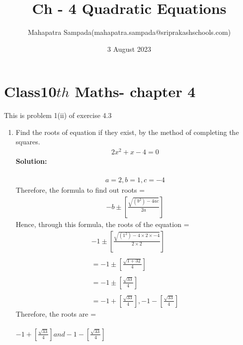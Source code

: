 \documentclass{article}
\title{Ch - 4 Quadratic Equations}
\author{Mahapatra Sampada(mahapatra.sampada@sriprakashschools.com)}
\date{3 August 2023}
\newcommand{\solution}{\noindent \textbf{Solution: }}
\begin{document}
\maketitle
\section*{Class10${th}$ Maths- chapter 4}
This is problem 1(ii) of exercise 4.3
\begin{enumerate}
\item Find the roots of equation if they exist, by the method of completing the squares.
\begin{align}
2x^2+x-4=0
\end{align}
\solution\\\\
\begin{align}
a=2 , b=1 , c=-4
\end{align}
Therefore, the formula to find out roots = 
\begin{align}
-b\pm[\frac{\sqrt{(b^2)-4ac}}{2a}]
\end{align}
Hence, through this formula, the roots of the equation = 
\begin{align}
-1\pm[\frac{\sqrt{(1^2)-4\times 2\times -4}}{2\times 2}] \\\\
=-1\pm[\frac{\sqrt{1+32}}{4}]\\\\
=-1\pm[\frac{\sqrt{33}}{4}]\\\\
=-1+[\frac{\sqrt{33}}{4}],-1-[\frac{\sqrt{33}}{4}]
\end{align}
Therefore, the roots are = \\\\
$-1+[\frac{\sqrt{33}}{4}] and -1-[\frac{\sqrt{33}}{4}]$


\end{enumerate}
\end{document}

